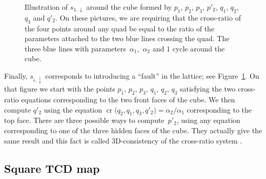 \documentclass[pdftex]{sigma}
\numberwithin{equation}{section}
\def\cro{\operatorname{cr}}
\begin{document}
\begin{figure}[ht]
		\caption{Illustration of $s_{1,\downarrow}$ around the cube formed by $p_1$, $p_2$, $p_3$, $p'_2$, $q_1$, $q_2$, $q_3$ and $q'_2$. On these pictures, we are requiring that the cross-ratio of the four points around any quad be equal to the ratio of the parameters attached to the two blue lines crossing the quad. The three blue lines with parameters~$\alpha_1$,~$\alpha_2$ and $1$ cycle around the cube.}
		\label{fig:consistency}
	\end{figure}	
	
	Finally, $s_{i,\downarrow}$ corresponds to introducing a ``fault'' in the lattice; see Figure~\ref{fig:consistency}. On that figure we start with the points $p_1$, $p_2$, $p_3$, $q_1$, $q_2$, $q_3$ satisfying the two cross-ratio equations corresponding to the two front faces of the cube. We then compute $q'_2$ using the equation ${\cro\big(q_2,q_1,q_3,q'_2\big)=\alpha_2/\alpha_1}$ corresponding to the top face. There are three possible ways to compute~$p'_2$, using any equation corresponding to one of the three hidden faces of the cube. They actually give the same result and this fact is called 3D-consistency of the cross-ratio system \cite{bsintegrablequads}.
	
	\subsection{Square TCD map}\label{sec:sqtcd}
	
\end{document}
